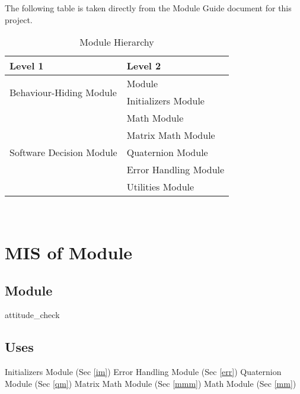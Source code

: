\documentclass[12pt, titlepage]{article}
\begin{document}
The following table is taken directly from the Module Guide document for this project.

\begin{table}[h!]
\centering
\begin{tabular}{p{} p{}}
\toprule
\textbf{Level 1} & \textbf{Level 2}\\
\midrule


\multirow{2}{0.3\textwidth}{Behaviour-Hiding Module} & \progname{} Module \\
  & Initializers Module \\
\midrule
\multirow{5}{0.3\textwidth}{Software Decision Module} & Math Module\\
  & Matrix Math Module \\
  & Quaternion Module \\
  & Error Handling Module \\
  & Utilities Module \\
\bottomrule

\end{tabular}
\caption{Module Hierarchy}
\label{TblMH}
\end{table}

\newpage
~\newpage

\section{MIS of \progname{} Module} \label{ac}

\subsection{Module}
attitude\_check

\subsection{Uses}
Initializers Module (Sec \ref{im}) \newline
Error Handling Module (Sec \ref{err}) \newline
Quaternion Module (Sec \ref{qm})\newline
Matrix Math Module (Sec \ref{mmm}) \newline
Math Module (Sec \ref{mm})
\end{document}
